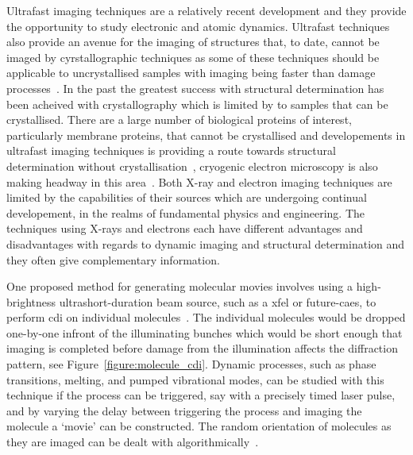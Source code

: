 Ultrafast imaging techniques are a relatively recent development and they provide the opportunity to study electronic and atomic dynamics.
Ultrafast techniques also provide an avenue for the imaging of structures that, to date, cannot be imaged by cyrstallographic techniques as some of these techniques should be applicable to uncrystallised samples with imaging being faster than damage processes~\cite{gaffney_imaging_2007,barty_ultrafast_2008,miao_beyond_2015}.
In the past the greatest success with structural determination has been acheived with crystallography which is limited by to samples that can be crystallised.
There are a large number of biological proteins of interest, particularly membrane proteins, that cannot be crystallised and developements in ultrafast imaging techniques is providing a route towards structural determination without crystallisation~\cite{dauter_current_2006,levitt_nature_2009}, cryogenic electron microscopy is also making headway in this area~\cite{henderson_model_1990,zhou_towards_2008}.
Both X-ray and electron imaging techniques are limited by the capabilities of their sources which are undergoing continual developement, in the realms of fundamental physics and engineering.
The techniques using X-rays and electrons each have different advantages and disadvantages with regards to dynamic imaging and structural determination and they often give complementary information.

One proposed method for generating molecular movies involves using a high-brightness ultrashort-duration beam source, such as a \gls{xfel} or future-\gls{caes}, to perform \gls{cdi} on individual molecules~\cite{chapman_femtosecond_2006,dwyer_femtosecond_2006,gaffney_imaging_2007}.
The individual molecules would be dropped one-by-one infront of the illuminating bunches which would be short enough that imaging is completed before damage from the illumination affects the diffraction pattern, see Figure~\ref{figure:molecule_cdi}.
Dynamic processes, such as phase transitions, melting, and pumped vibrational modes, can be studied with this technique if the process can be triggered, say with a precisely timed laser pulse, and by varying the delay between triggering the process and imaging the molecule a `movie' can be constructed.
The random orientation of molecules as they are imaged can be dealt with algorithmically~\cite{yefanov_orientation_2013}.

